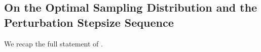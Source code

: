 \documentclass{article}
\newcommand{\Var}{\mathrm{Var}}
\newcommand{\EE}{\mathbb{E}}
\theoremstyle{definition}
\theoremstyle{plain}
\theoremstyle{remark}
\begin{document}




  


\subsection{On the Optimal Sampling Distribution and the Perturbation Stepsize Sequence}\label{appendix:optimal-sampling}
We recap the full statement of . 
\end{document}

